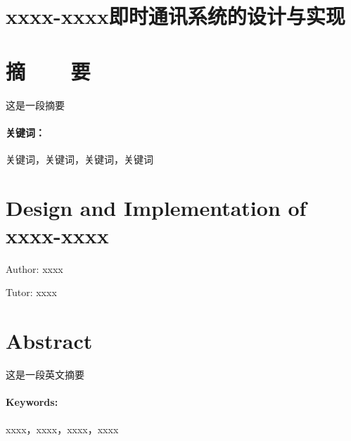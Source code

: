 \section*{xxxx-xxxx即时通讯系统的设计与实现}
\section*{摘\ \ \ \ 要}

	这是一段摘要
	

\paragraph{关键词：} 关键词，关键词，关键词，关键词

\clearpage


\section*{Design and Implementation of xxxx-xxxx}

\hfill Author: xxxx

\hfill Tutor: xxxx

\section*{Abstract}

	这是一段英文摘要
	
\paragraph{Keywords: }xxxx，xxxx，xxxx，xxxx






